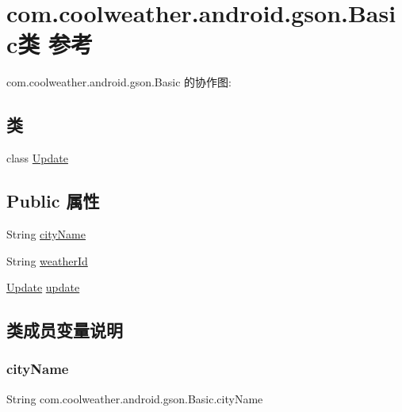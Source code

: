 \hypertarget{classcom_1_1coolweather_1_1android_1_1gson_1_1_basic}{}\section{com.\+coolweather.\+android.\+gson.\+Basic类 参考}
\label{classcom_1_1coolweather_1_1android_1_1gson_1_1_basic}


com.\+coolweather.\+android.\+gson.\+Basic 的协作图\+:
\subsection*{类}
\begin{DoxyCompactItemize}
\item 
class \mbox{\hyperlink{classcom_1_1coolweather_1_1android_1_1gson_1_1_basic_1_1_update}{Update}}
\end{DoxyCompactItemize}
\subsection*{Public 属性}
\begin{DoxyCompactItemize}
\item 
String \mbox{\hyperlink{classcom_1_1coolweather_1_1android_1_1gson_1_1_basic_a91411c3fe93c56850650aea7fa7fcbff}{city\+Name}}
\item 
String \mbox{\hyperlink{classcom_1_1coolweather_1_1android_1_1gson_1_1_basic_ad9196662867cc1c7ff1138de72cd180b}{weather\+Id}}
\item 
\mbox{\hyperlink{classcom_1_1coolweather_1_1android_1_1gson_1_1_basic_1_1_update}{Update}} \mbox{\hyperlink{classcom_1_1coolweather_1_1android_1_1gson_1_1_basic_a30df5ef8b24ae659017ad6cbb0c823f1}{update}}
\end{DoxyCompactItemize}


\subsection{类成员变量说明}
\mbox{\label{classcom_1_1coolweather_1_1android_1_1gson_1_1_basic_a91411c3fe93c56850650aea7fa7fcbff}} 
\subsubsection{\texorpdfstring{cityName}{cityName}}
{\footnotesize\ttfamily String com.\+coolweather.\+android.\+gson.\+Basic.\+city\+Name}

